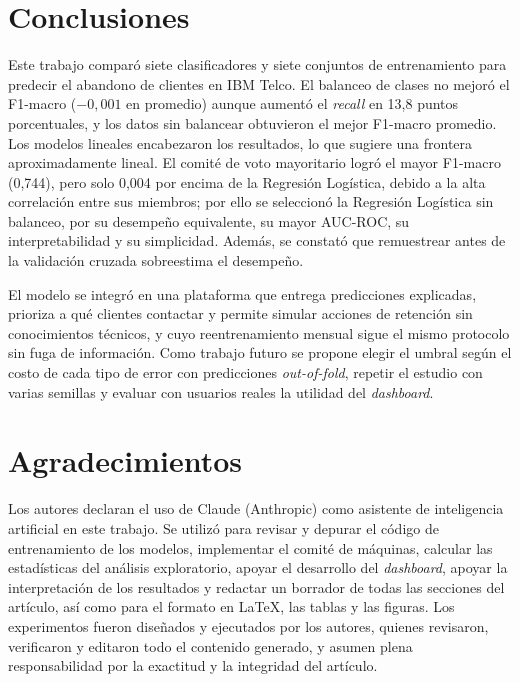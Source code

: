 \documentclass[conference]{IEEEtran}
\begin{document}
\section{Conclusiones}\label{sec:conclusiones}

Este trabajo comparó siete clasificadores y siete conjuntos de entrenamiento para predecir el abandono de clientes en IBM Telco. El balanceo de clases no mejoró el F1-macro ($-0{,}001$ en promedio) aunque aumentó el \emph{recall} en 13,8 puntos porcentuales, y los datos sin balancear obtuvieron el mejor F1-macro promedio. Los modelos lineales encabezaron los resultados, lo que sugiere una frontera aproximadamente lineal. El comité de voto mayoritario logró el mayor F1-macro (0,744), pero solo 0,004 por encima de la Regresión Logística, debido a la alta correlación entre sus miembros; por ello se seleccionó la Regresión Logística sin balanceo, por su desempeño equivalente, su mayor AUC-ROC, su interpretabilidad y su simplicidad. Además, se constató que remuestrear antes de la validación cruzada sobreestima el desempeño.

El modelo se integró en una plataforma que entrega predicciones explicadas, prioriza a qué clientes contactar y permite simular acciones de retención sin conocimientos técnicos, y cuyo reentrenamiento mensual sigue el mismo protocolo sin fuga de información. Como trabajo futuro se propone elegir el umbral según el costo de cada tipo de error con predicciones \emph{out-of-fold}, repetir el estudio con varias semillas y evaluar con usuarios reales la utilidad del \emph{dashboard}.

\section*{Agradecimientos}

Los autores declaran el uso de Claude (Anthropic) como asistente de inteligencia artificial en este trabajo. Se utilizó para revisar y depurar el código de entrenamiento de los modelos, implementar el comité de máquinas, calcular las estadísticas del análisis exploratorio, apoyar el desarrollo del \emph{dashboard}, apoyar la interpretación de los resultados y redactar un borrador de todas las secciones del artículo, así como para el formato en \LaTeX{}, las tablas y las figuras. Los experimentos fueron diseñados y ejecutados por los autores, quienes revisaron, verificaron y editaron todo el contenido generado, y asumen plena responsabilidad por la exactitud y la integridad del artículo.
\end{document}
